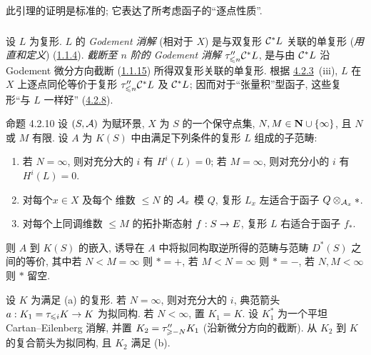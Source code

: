 此引理的证明是标准的; 它表达了所考虑函子的“逐点性质”.

\setcounter{subsubsection}{8}
\subsubsection{}

设 $L$ 为复形. $L$ 的 \emph{Godement 消解} (相对于 $X$) 是与双复形 $\sisi{C}{\Cc}^{\ast}L$ 关联的单复形 (\emph{用直和定义}) (\hyperref[XVII.subsubsec1.1.4]{1.1.4}). \emph{截断至 $n$ 阶的 Godement 消解} $\tau''_{\leq n}\sisi{C}{\Cc}^{\ast}L$, 是与由 $\sisi{C}{\Cc}^{\ast}L$ 沿 Godement 微分方向截断 (\hyperref[XVII.subsubsec1.1.15]{1.1.15}) 所得双复形关联的单复形. 根据 \hyperref[XVII.prop4.2.3]{4.2.3}~(iii), $L$ 在 $X$ 上逐点同伦等价于复形 $\tau''_{\leq n}\sisi{C}{\Cc}^{\ast}L$ 及 $\sisi{C}{\Cc}^{\ast}L$; 因而对于“张量积”型函子, 这些复形“与 $L$ 一样好” (\hyperref[XVII.lem4.2.8]{4.2.8}).

\begin{enonce*}{命题 4.2.10}
设 $(S,\Aa)$ 为赋环景, $X$ 为 $S$ 的一个保守点集, $N,M\in\NN\cup\{\infty\}$, 且 $N$ 或 $M$ 有限. 设 $A$ 为 $K(S)$ 中由满足下列条件的复形 $L$ 组成的子范畴:
\begin{enumerate}
\renewcommand{\theenumi}{\alph{enumi}}
\renewcommand{\labelenumi}{\theenumi)}
\item 若 $N=\infty$, 则对充分大的 $i$ 有 $H^i(L)=0$; 若 $M=\infty$, 则对充分小的 $i$ 有 $H^i(L)=0$.

\item 对每个\pageoriginale $x\in X$ 及每个 \tTor 维数 $\leq N$ 的 $\Aa_x$ 模 $Q$, 复形 $L_x$ 左适合于函子 $\sisi{M_x}{Q}\otimes_{\Aa_x}\ast$.

\item 对每个上同调维数 $\leq M$ 的拓扑斯态射 $f:\sisi{X^{\sim}}{S}\rightarrow E$, 复形 $L$ 右适合于函子 $f_{\ast}$.
\end{enumerate}

则 $A$ 到 $K(S)$ 的嵌入, 诱导在 $A$ 中将拟同构取逆所得的范畴与范畴 $D^{\ast}(S)$ 之间的等价, 其中若 $N<M=\infty$ 则 $\ast=+$, 若 $M<N=\infty$ 则 $\ast=-$, 若 $N,M<\infty$ 则 $\ast$ 留空.
\end{enonce*}

设 $K$ 为满足 (a) 的复形. 若 $N=\infty$, 则对充分大的 $i$, 典范箭头 $a:K_1=\sisi{\sigma}{\tau}_{\leq i}K\rightarrow K$ 为拟同构. 若 $N<\infty$, 置 $K_1=K$. 设 $K_1^{\ast}$ 为一个平坦 Cartan--Eilenberg 消解, 并置 $K_2=\tau''_{\geq\sisi{}{-}N}K_1$ (沿新微分方向的截断). 从 $K_2$ 到 $K$ 的复合箭头为拟同构, 且 $K_2$ 满足 (b).

